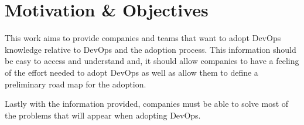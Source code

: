         
\section{Motivation \& Objectives} \label{chap:problem:section:motivation}

        This work aims to provide companies and teams that want to adopt DevOps knowledge relative to DevOps and the adoption process. This information should be easy to access and understand and, it should allow companies to have a feeling of the effort needed to adopt DevOps as well as allow them to define a preliminary road map for the adoption. 
        
        Lastly with the information provided, companies must be able to solve most of the problems that will appear when adopting DevOps.
